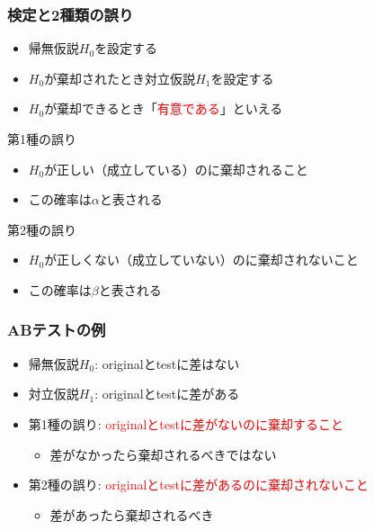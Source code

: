 \documentclass[aspectratio=169]{beamer}
\begin{document}
    \begin{frame}
        \frametitle{検定と2種類の誤り}
            \begin{itemize}
                \item 帰無仮説$H_0$を設定する
                \item $H_0$が棄却されたとき対立仮説$H_1$を設定する
                \item $H_0$が棄却できるとき「\textcolor{red}{有意である}」といえる
            \end{itemize}
            \begin{block}{第1種の誤り}
                \begin{itemize}
                    \item $H_0$が正しい（成立している）のに棄却されること
                    \item この確率は$\alpha$と表される
                \end{itemize}
                
            \end{block}
            \begin{block}{第2種の誤り}
                \begin{itemize}
                    \item $H_0$が正しくない（成立していない）のに棄却されないこと
                    \item この確率は$\beta$と表される
                \end{itemize}
            \end{block}
    \end{frame}

    \begin{frame}
        \frametitle{ABテストの例}
        \begin{itemize}
            \item 帰無仮説$H_0$: originalとtestに差はない
            \item 対立仮説$H_1$: originalとtestに差がある
            \item 第1種の誤り: \textcolor{red}{originalとtestに差がないのに棄却すること}
            \begin{itemize}
                \item 差がなかったら棄却されるべきではない
            \end{itemize}
            \item 第2種の誤り: \textcolor{red}{originalとtestに差があるのに棄却されないこと}
            \begin{itemize}
                \item 差があったら棄却されるべき
            \end{itemize}
        \end{itemize}
    \end{frame}
\end{document}
